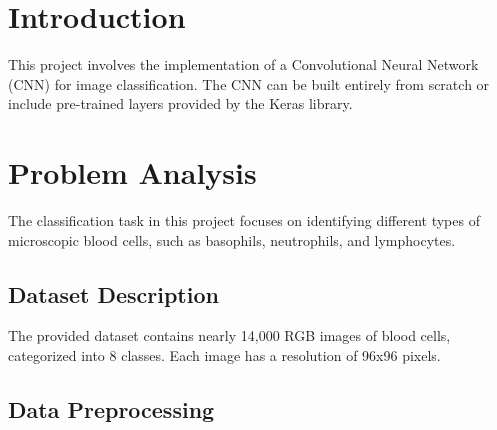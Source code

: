 \documentclass[11pt]{article}
\begin{document}
\begin{multicols}{2}

    \section{Introduction}

    This project involves the implementation of a Convolutional Neural Network (CNN) for image classification. The CNN can be built entirely from scratch or include pre-trained layers provided by the Keras library.

    \section{Problem Analysis}

    The classification task in this project focuses on identifying different types of microscopic blood cells, such as basophils, neutrophils, and lymphocytes.

    \subsection{Dataset Description}

    The provided dataset contains nearly 14,000 RGB images of blood cells, categorized into 8 classes. Each image has a resolution of 96x96 pixels.

    \subsection{Data Preprocessing}


\end{multicols}
\end{document}
